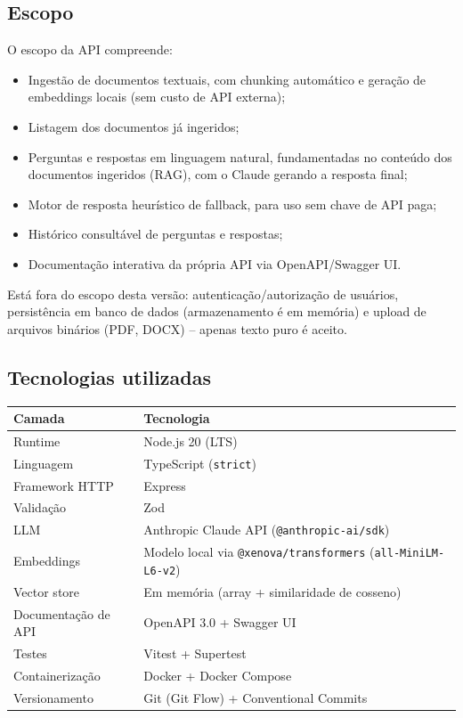 \documentclass[11pt,a4paper]{article}
\begin{document}
\subsection{Escopo}

O escopo da API compreende:

\begin{itemize}[leftmargin=1.5cm]
    \item Ingestão de documentos textuais, com chunking automático e geração de
          embeddings locais (sem custo de API externa);
    \item Listagem dos documentos já ingeridos;
    \item Perguntas e respostas em linguagem natural, fundamentadas no conteúdo dos
          documentos ingeridos (RAG), com o Claude gerando a resposta final;
    \item Motor de resposta heurístico de fallback, para uso sem chave de API paga;
    \item Histórico consultável de perguntas e respostas;
    \item Documentação interativa da própria API via OpenAPI/Swagger UI.
\end{itemize}

Está fora do escopo desta versão: autenticação/autorização de usuários, persistência
em banco de dados (armazenamento é em memória) e upload de arquivos binários (PDF,
DOCX) -- apenas texto puro é aceito.

\subsection{Tecnologias utilizadas}

\begin{center}
\begin{tabular}{ll}
\toprule
\textbf{Camada} & \textbf{Tecnologia} \\
\midrule
Runtime & Node.js 20 (LTS) \\
Linguagem & TypeScript (\texttt{strict}) \\
Framework HTTP & Express \\
Validação & Zod \\
LLM & Anthropic Claude API (\texttt{@anthropic-ai/sdk}) \\
Embeddings & Modelo local via \texttt{@xenova/transformers} (\texttt{all-MiniLM-L6-v2}) \\
Vector store & Em memória (array + similaridade de cosseno) \\
Documentação de API & OpenAPI 3.0 + Swagger UI \\
Testes & Vitest + Supertest \\
Containerização & Docker + Docker Compose \\
Versionamento & Git (Git Flow) + Conventional Commits \\
\bottomrule
\end{tabular}
\end{center}
\end{document}
